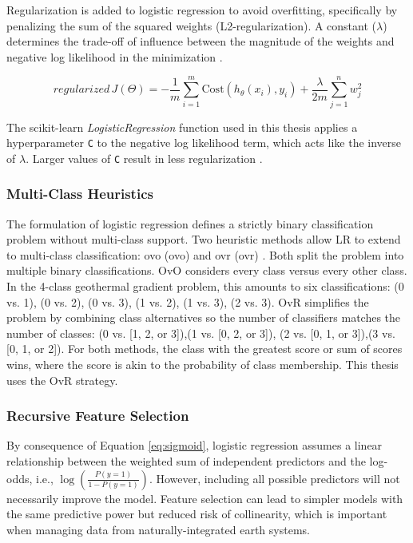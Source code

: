Regularization is added to logistic regression to avoid overfitting, specifically by penalizing the sum of the squared weights (L2-regularization). A constant ($\lambda$) determines the trade-off of influence between the magnitude of the weights and negative log likelihood in the minimization \citep{ng_regularization_2011}.

\begin{equation}
\label{eq:logreg_cost_reg}
    regularized\,J(\Theta) = -\frac{1}{m}\sum_{i=1}^{m}{\text{Cost}(h_{\theta}(x_i),y_i) + \frac{\lambda}{2m}\sum_{j=1}^{n}{w_j^2}}
\end{equation}

The scikit-learn \textit{LogisticRegression} function used in this thesis applies a hyperparameter \verb|C| to the negative log likelihood term, which acts like the inverse of $\lambda$. Larger values of \verb|C| result in less regularization \citep{scikit-learn_1111_2021}.

\subsubsection{Multi-Class Heuristics} \label{ch3:lr_multiclass}
The formulation of logistic regression defines a strictly binary classification problem without multi-class support. Two heuristic methods allow LR to extend to multi-class classification: \acrlong{ovo} (\acrshort{ovo}) and \acrlong{ovr} (\acrshort{ovr}) \citep{brownlee_one-vs-rest_2020,scikit-learn_multiclass_2021}. Both split the problem into multiple binary classifications. OvO considers every class versus every other class. In the 4-class geothermal gradient problem, this amounts to six classifications: {(0 vs. 1), (0 vs. 2), (0 vs. 3), (1 vs. 2), (1 vs. 3), (2 vs. 3)}. OvR simplifies the problem by combining class alternatives so the number of classifiers matches the number of classes: {(0 vs. [1, 2, or 3]),(1 vs. [0, 2, or 3]), (2 vs. [0, 1, or 3]),(3 vs. [0, 1, or 2])}. For both methods, the class with the greatest score or sum of scores wins, where the score is akin to the probability of class membership. This thesis uses the OvR strategy.

\subsubsection{Recursive Feature Selection} \label{ch3:lr_rfe}
By consequence of Equation \ref{eq:sigmoid}, logistic regression assumes a linear relationship between the weighted sum of independent predictors and the log-odds, i.e., $\log(\frac{P(y=1)}{1-P(y=1)})$. However, including all possible predictors will not necessarily improve the model. Feature selection can lead to simpler models with the same predictive power but reduced risk of collinearity, which is important when managing data from naturally-integrated earth systems.


